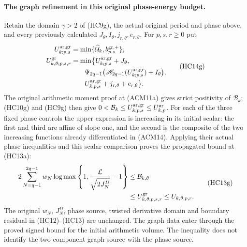 \paragraph{The graph refinement in this original phase-energy budget.}
Retain the domain $\gamma>2$ of (HC9g), the actual original period
and phase above, and every previously calculated $J_\theta,I_\theta,
j_{r,\theta},e_{r,\theta}$. For $p,s,r\geq0$ put
\[
 \begin{aligned}
 U_{k;p,s}^{\rm ar,gr}
 &=\min\{\widehat{\mathcal U}_k,b_{p,s}^{\rm gr,+}\},\\
 U_{k,\theta;p,s,r}^{\rm gr}
 &=\min\bigl\{U_{k;p,s}^{\rm ar,gr}+J_\theta,\\
 &\qquad\Psi_{2q-1}\bigl(
       \mathscr H_{2q-1}(U_{k;p,s}^{\rm ar,gr})+I_\theta\bigr),\\
 &\qquad U_{k;p,s}^{\rm ar,gr}+j_{r,\theta}+e_{r,\theta}\bigr\}.
 \end{aligned}
 \tag{HC14g}
\]
The original arithmetic moment proof at (ACM11a) gives strict
positivity of $\mathcal B_k$; (HC10g) and (HC9g) then give
$0<\mathcal B_k\leq U_{k;p,s}^{\rm ar,gr}\leq U_{k,p}^{\rm ar}$.
For each of the three fixed phase controls the upper expression
is increasing in its initial scalar: the first and third are
affine of slope one, and the second is the composite of the
two increasing functions already differentiated in (ACM14).
Applying their actual phase inequalities and this scalar
comparison proves the propagated bound at (HC13a):
\[
 \begin{aligned}
 2\sum_{N=q-1}^{2q-1}w_N
 \log\max\left\{1,\frac{\mathcal L}{\sqrt{2J_N^D}}-1\right\}
 &\leq\mathcal B_{k,\theta}\\
 &\leq U_{k,\theta;p,s,r}^{\rm gr}
 \leq U_{k,\theta;p,r}.
 \end{aligned}
 \tag{HC13g}
\]
The original $w_N$, $J_N^D$, phase source, twisted derivative
domain and boundary residual in (HC12)--(HC13) are unchanged.
The graph data enter through the proved signed bound for the
initial arithmetic volume. The inequality does not identify
the two-component graph source with the phase source.

